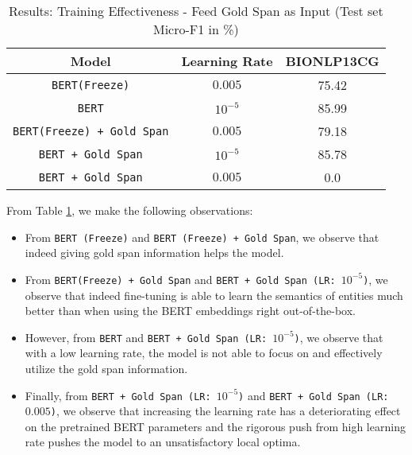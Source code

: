 \begin{table}[h!]
\centering
\begin{tabular}{|c|c|c|}\hline
	\textbf{Model} & \textbf{Learning Rate} & \textbf{BIONLP13CG}\\\hline
	\texttt{BERT(Freeze)} & $0.005$ & 75.42\\\hline
	\texttt{BERT} & $10^{-5}$ & 85.99\\\hline
	\texttt{BERT(Freeze) + Gold Span} & $0.005$ & 79.18\\\hline
	\texttt{BERT + Gold Span} & $10^{-5}$ & 85.78\\\hline
	\texttt{BERT + Gold Span} & $0.005$ & 0.0\\\hline
	\end{tabular}
    \caption{Results: Training Effectiveness - Feed Gold Span as Input (Test set Micro-F1 in \%)}
    \label{tab:res_training_span_input}
\end{table}

From Table \ref{tab:res_training_span_input}, we make the following observations:

\begin{itemize}
    \item From \texttt{BERT (Freeze)} and \texttt{BERT (Freeze) + Gold Span}, we observe that indeed giving gold span information helps the model.
    
    \item From \texttt{BERT(Freeze) + Gold Span} and \texttt{BERT + Gold Span (LR: $10^{-5}$)}, we observe that indeed fine-tuning is able to learn the semantics of entities much better than when using the BERT embeddings right out-of-the-box.
    
    \item However, from \texttt{BERT} and \texttt{BERT + Gold Span (LR: $10^{-5}$)}, we observe that with a low learning rate, the model is not able to focus on and effectively utilize the gold span information.
    
    \item Finally, from \texttt{BERT + Gold Span (LR: $10^{-5}$)} and \texttt{BERT + Gold Span (LR: $0.005$)}, we observe that increasing the learning rate has a deteriorating effect on the pretrained BERT parameters and the rigorous push from high learning rate pushes the model to an unsatisfactory local optima.
\end{itemize}


